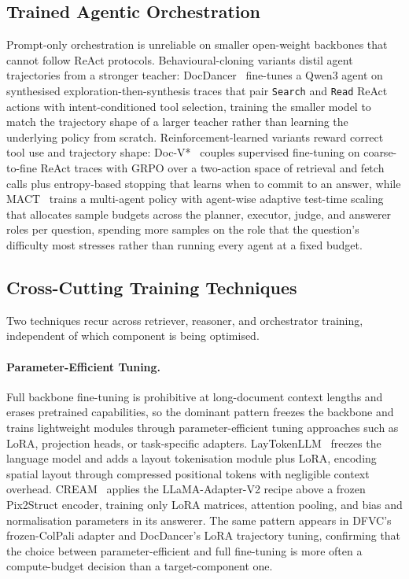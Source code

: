 \documentclass[11pt]{article}
\begin{document}
\subsection{Trained Agentic Orchestration}
\label{sec:train-orchestration}

Prompt-only orchestration is unreliable on smaller open-weight backbones that cannot follow ReAct protocols. Behavioural-cloning variants distil agent trajectories from a stronger teacher: DocDancer~\cite{zhang2026docdancer} fine-tunes a Qwen3 agent on synthesised exploration-then-synthesis traces that pair \texttt{Search} and \texttt{Read} ReAct actions with intent-conditioned tool selection, training the smaller model to match the trajectory shape of a larger teacher rather than learning the underlying policy from scratch. Reinforcement-learned variants reward correct tool use and trajectory shape: Doc-V*~\cite{zheng2026docv} couples supervised fine-tuning on coarse-to-fine ReAct traces with GRPO over a two-action space of retrieval and fetch calls plus entropy-based stopping that learns when to commit to an answer, while MACT~\cite{yu2025mact} trains a multi-agent policy with agent-wise adaptive test-time scaling that allocates sample budgets across the planner, executor, judge, and answerer roles per question, spending more samples on the role that the question's difficulty most stresses rather than running every agent at a fixed budget.

\subsection{Cross-Cutting Training Techniques}
\label{sec:train-crosscutting}

Two techniques recur across retriever, reasoner, and orchestrator training, independent of which component is being optimised.

\paragraph{Parameter-Efficient Tuning.} Full backbone fine-tuning is prohibitive at long-document context lengths and erases pretrained capabilities, so the dominant pattern freezes the backbone and trains lightweight modules through parameter-efficient tuning approaches such as LoRA, projection heads, or task-specific adapters. LayTokenLLM~\cite{zhu2025laytokenllm} freezes the language model and adds a layout tokenisation module plus LoRA, encoding spatial layout through compressed positional tokens with negligible context overhead. CREAM~\cite{zhang2024cream} applies the LLaMA-Adapter-V2 recipe above a frozen Pix2Struct encoder, training only LoRA matrices, attention pooling, and bias and normalisation parameters in its answerer. The same pattern appears in DFVC's frozen-ColPali adapter and DocDancer's LoRA trajectory tuning, confirming that the choice between parameter-efficient and full fine-tuning is more often a compute-budget decision than a target-component one.
\end{document}
